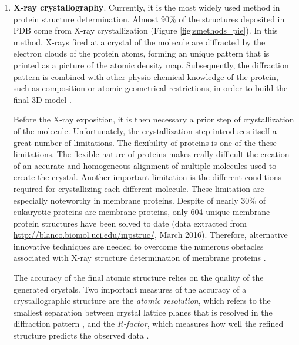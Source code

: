 \documentclass[11pt, b5paper,twoside]{tesi_upf}
\begin{document}
\begin{enumerate}[label=(\alph*)]
\item \textbf{X-ray crystallography}. Currently, it is the most widely used method in protein structure determination. Almost 90$\%$ of the structures deposited in PDB come from X-ray crystallization (Figure \ref{fig:smethods_pie}). In this method, X-rays fired at a crystal of the molecule are diffracted by the electron clouds of the protein atoms, forming an unique pattern that is printed as a picture of the atomic density map. Subsequently, the diffraction pattern is combined with other physio-chemical knowledge of the protein, such as composition or atomic geometrical restrictions, in order to build the final 3D model \cite{Smyth2000}. 
\par Before the X-ray exposition, it is then necessary a prior step of crystallization of the molecule.  Unfortunately, the crystallization step introduces itself a great number of limitations.  The flexibility of proteins is one of the these limitations. The flexible nature of proteins makes really difficult the creation of an accurate and homogeneous alignment of multiple molecules used to create the crystal. Another important limitation is the different conditions required for crystallizing each different molecule. These limitation are especially noteworthy in membrane proteins. Despite of nearly 30$\%$ of eukaryotic proteins are membrane proteins, only 604 unique membrane protein structures have been solved to date (data extracted from \url{http://blanco.biomol.uci.edu/mpstruc/}, March 2016). Therefore, alternative innovative techniques are needed to overcome the numerous obstacles associated with X-ray structure determination of membrane proteins \cite{Bill2011}. 
\par The accuracy of the final atomic structure relies on the quality of the generated crystals. Two important measures of the accuracy of a crystallographic structure are the \textit{atomic resolution}, which refers to the smallest separation between crystal lattice planes that is resolved in the diffraction pattern \cite{Yaffe2005}, and the \textit{R-factor}, which measures how well the refined structure predicts the observed data \cite{Morris1992}. 


\end{enumerate}
\end{document}
